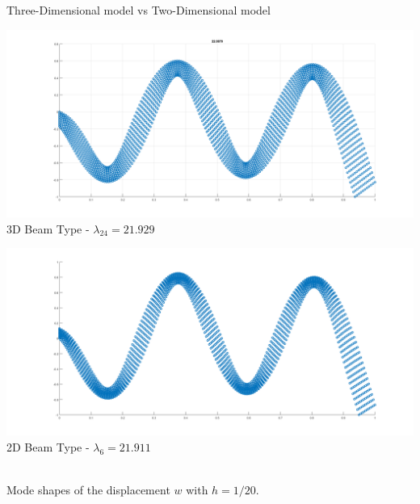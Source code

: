 \documentclass{beamer}
\begin{document}
\begin{frame}{Three-Dimensional model vs Two-Dimensional model}
    \begin{minipage}[b]{0.45\textwidth}
        \includegraphics[width=\textwidth]{3D22.png}
        \\ 3D Beam Type - $\lambda_{24} = 21.929$
        \label{fig:minipage4}
    \end{minipage}
    \hfill
    \begin{minipage}[b]{0.45\textwidth}
        \includegraphics[width=\textwidth]{2D6.png}
        \\ 2D Beam Type - $\lambda_6 = 21.911$
        \label{fig:minipage3}
    \end{minipage}

    \\ Mode shapes of the displacement \( w \) with \( h=1/20 \).
\end{frame}
\end{document}
